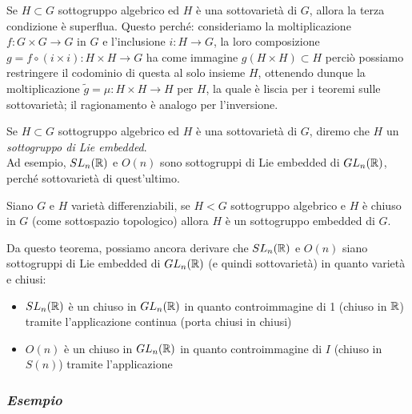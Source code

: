 \begin{remark}
	Se $ H \subset G $ sottogruppo algebrico ed $ H $ è una sottovarietà di $ G $, allora la terza condizione è superflua. Questo perché: consideriamo la moltiplicazione $ f : G \times G \to G $ in $ G $ e l'inclusione $ i : H \to G $, la loro composizione $ g = f \circ (i \times i) : H \times H \to G $ ha come immagine $ g(H \times H) \subset H $ perciò possiamo restringere il codominio di questa al solo insieme $ H $, ottenendo dunque la moltiplicazione $ \tilde{g} = \mu : H \times H \to H $ per $ H $, la quale è liscia per i teoremi sulle sottovarietà; il ragionamento è analogo per l'inversione.
\end{remark}

Se $ H \subset G $ sottogruppo algebrico ed $ H $ è una sottovarietà di $ G $, diremo che $ H $ un \textit{sottogruppo di Lie embedded}.\\
Ad esempio, $ SL_{n}(\mathbb{R}) $ e $ O(n) $ sono sottogruppi di Lie embedded di $ GL_{n}(\mathbb{R}) $, perché sottovarietà di quest'ultimo.

\begin{theorem}\label{th-liesub-var}
	Siano $ G $ e $ H $ varietà differenziabili, se $ H < G $ sottogruppo algebrico e $ H $ è chiuso in $ G $ (come sottospazio topologico) allora $ H $ è un sottogruppo embedded di $ G $.
\end{theorem}

Da questo teorema, possiamo ancora derivare che $ SL_{n}(\mathbb{R}) $ e $ O(n) $ siano sottogruppi di Lie embedded di $ GL_{n}(\mathbb{R}) $ (e quindi sottovarietà) in quanto varietà e chiusi:

\begin{itemize}
	\item $ SL_{n}(\mathbb{R}) $ è un chiuso in $ GL_{n}(\mathbb{R}) $ in quanto controimmagine di 1 (chiuso in $ \mathbb{R} $) tramite l'applicazione continua (porta chiusi in chiusi)
	
	
	\item $ O(n) $ è un chiuso in $ GL_{n}(\mathbb{R}) $ in quanto controimmagine di $ I $ (chiuso in $ S(n) $) tramite l'applicazione
	
\end{itemize}

\subsubsection{\textit{Esempio}}

